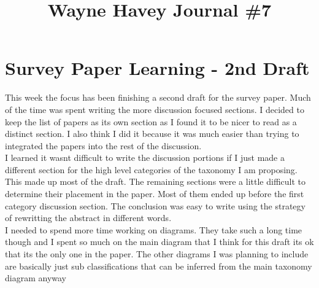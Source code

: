 \documentclass[conference]{IEEEtran}
\begin{document}
\title{Wayne Havey Journal \#7\\
}

\author{
}

\maketitle

\section{Survey Paper Learning - 2nd Draft}
This week the focus has been finishing a second draft for the survey paper. Much of the time was spent writing the more discussion focused sections. I decided to keep the list of papers as its own section as I found it to be nicer to read as a distinct section. I also think I did it because it was much easier than trying to integrated the papers into the rest of the discussion.\\
I learned it wasnt difficult to write the discussion portions if I just made a different section for the high level categories of the taxonomy I am proposing. This made up most of the draft. The remaining sections were a little difficult to determine their placement in the paper. Most of them ended up before the first category discussion section. The conclusion was easy to write using the strategy of rewritting the abstract in different words.\\
I needed to spend more time working on diagrams. They take such a long time though and I spent so much on the main diagram that I think for this draft its ok that its the only one in the paper. The other diagrams I was planning to include are basically just sub classifications that can be inferred from the main taxonomy diagram anyway
\end{document}
